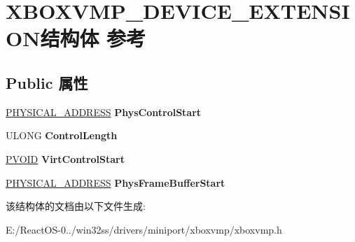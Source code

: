 \hypertarget{struct_x_b_o_x_v_m_p___d_e_v_i_c_e___e_x_t_e_n_s_i_o_n}{}\section{X\+B\+O\+X\+V\+M\+P\+\_\+\+D\+E\+V\+I\+C\+E\+\_\+\+E\+X\+T\+E\+N\+S\+I\+O\+N结构体 参考}
\label{struct_x_b_o_x_v_m_p___d_e_v_i_c_e___e_x_t_e_n_s_i_o_n}
\subsection*{Public 属性}
\begin{DoxyCompactItemize}
\item 
\mbox{\label{struct_x_b_o_x_v_m_p___d_e_v_i_c_e___e_x_t_e_n_s_i_o_n_a3c22b18075127ceaab705b139bd96838}} 
\hyperlink{union___l_a_r_g_e___i_n_t_e_g_e_r}{P\+H\+Y\+S\+I\+C\+A\+L\+\_\+\+A\+D\+D\+R\+E\+SS} {\bfseries Phys\+Control\+Start}
\item 
\mbox{\label{struct_x_b_o_x_v_m_p___d_e_v_i_c_e___e_x_t_e_n_s_i_o_n_a06566f234a03abd428a08fe8482afa19}} 
U\+L\+O\+NG {\bfseries Control\+Length}
\item 
\mbox{\label{struct_x_b_o_x_v_m_p___d_e_v_i_c_e___e_x_t_e_n_s_i_o_n_a8f13487f2aca28c2def59d490503dcc8}} 
\hyperlink{interfacevoid}{P\+V\+O\+ID} {\bfseries Virt\+Control\+Start}
\item 
\mbox{\label{struct_x_b_o_x_v_m_p___d_e_v_i_c_e___e_x_t_e_n_s_i_o_n_a2e888c4cb1810924996bfa63292dd76e}} 
\hyperlink{union___l_a_r_g_e___i_n_t_e_g_e_r}{P\+H\+Y\+S\+I\+C\+A\+L\+\_\+\+A\+D\+D\+R\+E\+SS} {\bfseries Phys\+Frame\+Buffer\+Start}
\end{DoxyCompactItemize}


该结构体的文档由以下文件生成\+:\begin{DoxyCompactItemize}
\item 
E\+:/\+React\+O\+S-\/0../win32ss/drivers/miniport/xboxvmp/xboxvmp.\+h\end{DoxyCompactItemize}
